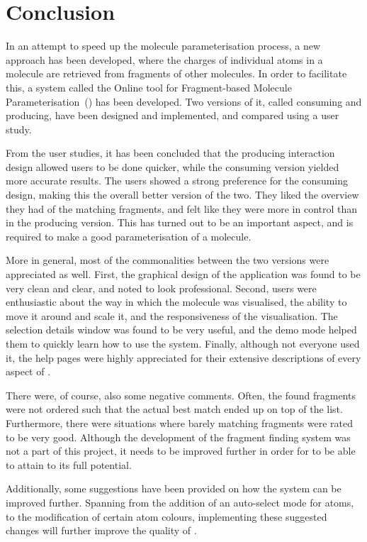 \chapter{Conclusion}

In an attempt to speed up the molecule parameterisation process, a new approach has been developed, where the charges of individual atoms in a molecule are retrieved from fragments of other molecules. In order to facilitate this, a system called the Online tool for Fragment-based Molecule Parameterisation~(\oframp) has been developed. Two versions of it, called consuming and producing, have been designed and implemented, and compared using a user study.

From the user studies, it has been concluded that the producing interaction design allowed users to be done quicker, while the consuming version yielded more accurate results. The users showed a strong preference for the consuming design, making this the overall better version of the two. They liked the overview they had of the matching fragments, and felt like they were more in control than in the producing version. This has turned out to be an important aspect, and is required to make a good parameterisation of a molecule.

More in general, most of the commonalities between the two versions were appreciated as well. First, the graphical design of the application was found to be very clean and clear, and noted to look professional. Second, users were enthusiastic about the way in which the molecule was visualised, the ability to move it around and scale it, and the responsiveness of the visualisation. The selection details window was found to be very useful, and the demo mode helped them to quickly learn how to use the system. Finally, although not everyone used it, the help pages were highly appreciated for their extensive descriptions of every aspect of \oframp.

There were, of course, also some negative comments. Often, the found fragments were not ordered such that the actual best match ended up on top of the list. Furthermore, there were situations where barely matching fragments were rated to be very good. Although the development of the fragment finding system was not a part of this project, it needs to be improved further in order for \oframp{} to be able to attain to its full potential.

Additionally, some suggestions have been provided on how the system can be improved further. Spanning from the addition of an auto-select mode for atoms, to the modification of certain atom colours, implementing these suggested changes will further improve the quality of \oframp.

